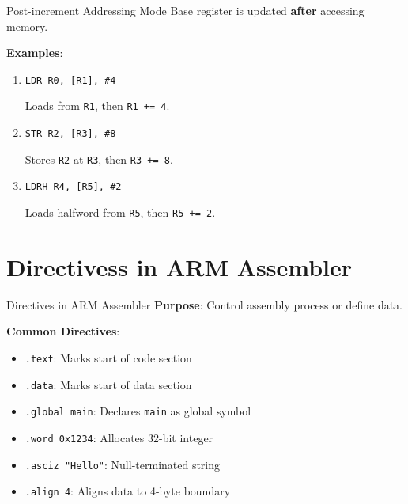 \documentclass[aspectratio=169]{beamer}
\begin{document}
\begin{frame}{Post-increment Addressing Mode}
    Base register is updated \textbf{after} accessing memory.
    
    \textbf{Examples}:
    \begin{enumerate}
        \item \texttt{LDR R0, [R1], \#4}  
        
        Loads from \texttt{R1}, then \texttt{R1 += 4}.
        
        \item \texttt{STR R2, [R3], \#8}  
        
        Stores \texttt{R2} at \texttt{R3}, then \texttt{R3 += 8}.
        
        \item \texttt{LDRH R4, [R5], \#2}  
        
        Loads halfword from \texttt{R5}, then \texttt{R5 += 2}.
    \end{enumerate}
\end{frame}

    
\section{Directivess in ARM Assembler}
\begin{frame}
    \sectionpage
\end{frame}


\begin{frame}{Directives in ARM Assembler}
    \textbf{Purpose}: Control assembly process or define data.
    
    \textbf{Common Directives}:
    \begin{itemize}
        \item \texttt{.text}: Marks start of code section
        \item \texttt{.data}: Marks start of data section
        \item \texttt{.global main}: Declares \texttt{main} as global symbol
        \item \texttt{.word 0x1234}: Allocates 32-bit integer
        \item \texttt{.asciz "Hello"}: Null-terminated string
        \item \texttt{.align 4}: Aligns data to 4-byte boundary
    \end{itemize}
\end{frame}
\end{document}
